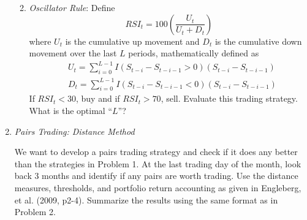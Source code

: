 \documentclass[12pt]{article}
\begin{document}
\begin{enumerate}
\begin{enumerate}
\begin{itemize}
\end{itemize}
\item{\it Oscillator Rule}: Define
$$RSI_t = 100\left(\frac{U_t}{U_t+D_t}\right)$$
where $U_t$ is the cumulative up movement and $D_t$ is the cumulative down movement over the last $L$ periods, mathematically defined as
\begin{align*}
&U_t = \sum_{i=0}^{L-1}I(S_{t-i} - S_{t-i-1}>0)(S_{t-i}-S_{t-i-1})\\
&D_t = \sum_{i=0}^{L-1}I(S_{t-i} - S_{t-i-1}<0)(S_{t-i}-S_{t-i-1})
\end{align*}
If $RSI_t<30$, buy and if $RSI_t>70$, sell. Evaluate this trading strategy. What is the optimal ``$L$''?

\end{enumerate}


\item {\it Pairs Trading: Distance Method}

We want to develop a pairs trading strategy and check if it does any better than  the strategies in Problem 1. At the last trading day of the month, look back 3 months and identify if any pairs are worth trading. Use the distance measures, thresholds, and portfolio return accounting as given in Engleberg, et al. (2009, p2-4). Summarize the results using the same format as in Problem 2.

%
%
%
%
%
\end{enumerate}
\end{document}
